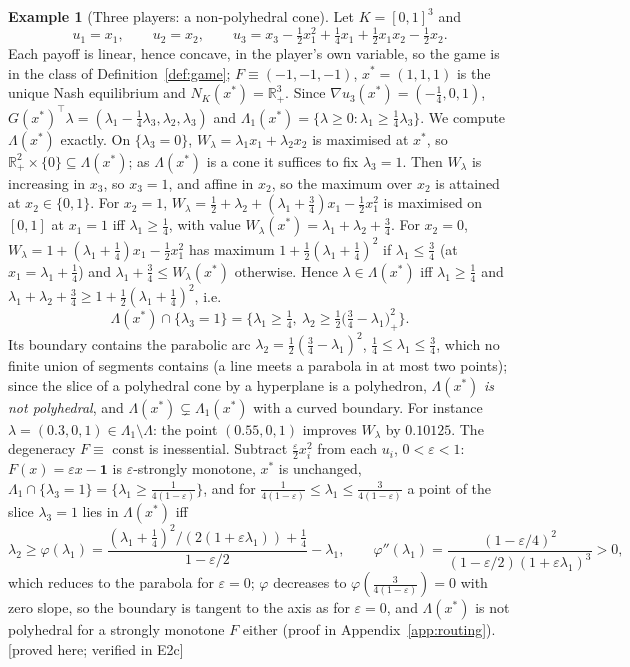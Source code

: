 \documentclass[11pt,a4paper]{article}
\theoremstyle{plain}
\theoremstyle{definition}
\newtheorem{example}[theorem]{Example}
\theoremstyle{remark}
\newcommand{\R}{\mathbb{R}}
\newcommand{\NC}{N}
\newcommand{\status}[1]{\textsf{\small [#1]}}
\newcommand{\Lam}{\Lambda}
\newcommand{\Lone}{\Lambda_{1}}
\begin{document}
\begin{example}[Three players: a non-polyhedral cone]\label{ex:nonpoly}
Let $K=[0,1]^3$ and
\[
u_1=x_1,\qquad u_2=x_2,\qquad u_3=x_3-\tfrac12x_1^2+\tfrac14x_1+\tfrac12x_1x_2-\tfrac12x_2 .
\]
Each payoff is linear, hence concave, in the player's own variable, so the game is in the class of Definition~\ref{def:game}; $F\equiv(-1,-1,-1)$, $x^*=(1,1,1)$ is the unique Nash equilibrium and $\NC_K(x^*)=\R^3_+$. Since $\nabla u_3(x^*)=(-\tfrac14,0,1)$, $G(x^*)^{\!\top}\lambda=(\lambda_1-\tfrac14\lambda_3,\lambda_2,\lambda_3)$ and $\Lone(x^*)=\{\lambda\ge 0:\lambda_1\ge\tfrac14\lambda_3\}$. We compute $\Lam(x^*)$ exactly. On $\{\lambda_3=0\}$, $W_\lambda=\lambda_1x_1+\lambda_2x_2$ is maximised at $x^*$, so $\R^2_+\times\{0\}\subseteq\Lam(x^*)$; as $\Lam(x^*)$ is a cone it suffices to fix $\lambda_3=1$. Then $W_\lambda$ is increasing in $x_3$, so $x_3=1$, and affine in $x_2$, so the maximum over $x_2$ is attained at $x_2\in\{0,1\}$. For $x_2=1$, $W_\lambda=\tfrac12+\lambda_2+(\lambda_1+\tfrac34)x_1-\tfrac12x_1^2$ is maximised on $[0,1]$ at $x_1=1$ iff $\lambda_1\ge\tfrac14$, with value $W_\lambda(x^*)=\lambda_1+\lambda_2+\tfrac34$. For $x_2=0$, $W_\lambda=1+(\lambda_1+\tfrac14)x_1-\tfrac12x_1^2$ has maximum $1+\tfrac12(\lambda_1+\tfrac14)^2$ if $\lambda_1\le\tfrac34$ (at $x_1=\lambda_1+\tfrac14$) and $\lambda_1+\tfrac34\le W_\lambda(x^*)$ otherwise. Hence $\lambda\in\Lam(x^*)$ iff $\lambda_1\ge\tfrac14$ and $\lambda_1+\lambda_2+\tfrac34\ge1+\tfrac12(\lambda_1+\tfrac14)^2$, i.e.
\[
\Lam(x^*)\cap\{\lambda_3=1\}=\big\{\lambda_1\ge\tfrac14,\ \lambda_2\ge\tfrac12\big(\tfrac34-\lambda_1\big)_+^2\big\}.
\]
Its boundary contains the parabolic arc $\lambda_2=\tfrac12(\tfrac34-\lambda_1)^2$, $\tfrac14\le\lambda_1\le\tfrac34$, which no finite union of segments contains (a line meets a parabola in at most two points); since the slice of a polyhedral cone by a hyperplane is a polyhedron, $\Lam(x^*)$ \emph{is not polyhedral}, and $\Lam(x^*)\subsetneq\Lone(x^*)$ with a curved boundary. For instance $\lambda=(0.3,0,1)\in\Lone\setminus\Lam$: the point $(0.55,0,1)$ improves $W_\lambda$ by $0.10125$. The degeneracy $F\equiv$ const is inessential. Subtract $\tfrac\varepsilon2x_i^2$ from each $u_i$, $0<\varepsilon<1$: $F(x)=\varepsilon x-\mathbf 1$ is $\varepsilon$-strongly monotone, $x^*$ is unchanged, $\Lone\cap\{\lambda_3=1\}=\{\lambda_1\ge\frac1{4(1-\varepsilon)}\}$, and for $\frac1{4(1-\varepsilon)}\le\lambda_1\le\frac3{4(1-\varepsilon)}$ a point of the slice $\lambda_3=1$ lies in $\Lam(x^*)$ iff
\[
\lambda_2\ge\varphi(\lambda_1)=\frac{(\lambda_1+\frac14)^2/(2(1+\varepsilon\lambda_1))+\frac14}{1-\varepsilon/2}-\lambda_1,\qquad \varphi''(\lambda_1)=\frac{(1-\varepsilon/4)^2}{(1-\varepsilon/2)(1+\varepsilon\lambda_1)^3}>0,
\]
which reduces to the parabola for $\varepsilon=0$; $\varphi$ decreases to $\varphi(\frac{3}{4(1-\varepsilon)})=0$ with zero slope, so the boundary is tangent to the axis as for $\varepsilon=0$, and $\Lam(x^*)$ is not polyhedral for a strongly monotone $F$ either (proof in Appendix~\ref{app:routing}). \status{proved here; verified in E2c}
\end{example}
\end{document}
